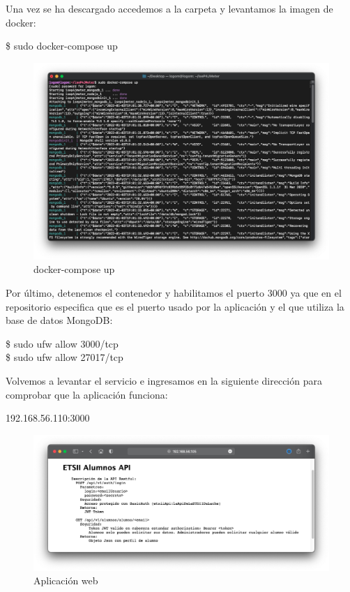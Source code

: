 Una vez se ha descargado accedemos a la carpeta y levantamos la imagen de docker:
\begin{tcolorbox}[colback=black!10, halign=left]
    \$ sudo docker-compose up
\end{tcolorbox}
\begin{figure}[H]
    \centering
    \includegraphics[scale=0.4]{images/docker_compose.png}
    \caption{docker-compose up}
    \label{fig:docker_compose}
\end{figure}

Por último, detenemos el contenedor y habilitamos el puerto 3000 ya que en el repositorio especifica que es el puerto usado por la aplicación y el que utiliza la base
de datos MongoDB:
\begin{tcolorbox}[colback=black!10, halign=left]
    \$ sudo ufw allow 3000/tcp \\
    \$ sudo ufw allow 27017/tcp
\end{tcolorbox}

Volvemos a levantar el servicio e ingresamos en la siguiente dirección para comprobar que la aplicación funciona:
\begin{tcolorbox}[colback=black!10, halign=left]
    192.168.56.110:3000
\end{tcolorbox}
\begin{figure}[H]
    \centering
    \includegraphics[scale=0.33]{images/iseP4JMeter.png}
    \caption{Aplicación web}
    \label{fig:iseP4JMeter}
\end{figure}

\begin{thebibliography}{0}
    \bibitem{} \href{}{}
\end{thebibliography}



